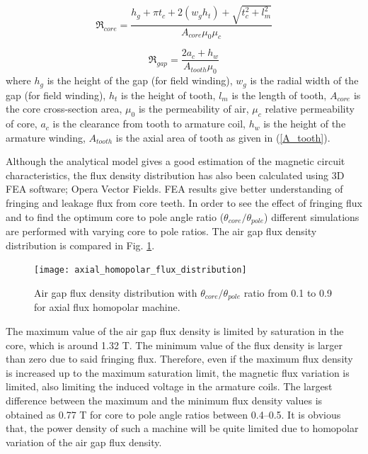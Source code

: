 \documentclass[final,peerreview,onecolumn]{IEEEtran}
\begin{document}
\begin{equation}
    \Re_{core}=\frac{h_{g}+\pi t_{c}+2(w_{g}h_{t})+\sqrt{t_{c}^2+l_{m}^2}}{A_{core}\mu_{0}\mu_{c}}
\end{equation}

\begin{equation}
    \Re_{gap}=\frac{2a_{c}+h_{w}}{A_{tooth}\mu_{0}}
\end{equation}
where $h_{g}$ is the height of the gap (for field winding), $w_{g}$ is the radial width of the gap (for field winding), $h_{t}$ is the height of tooth, $l_{m}$ is the length of tooth, $A_{core}$ is the core cross-section area, $\mu_{0}$ is the permeability of air, $\mu_{c}$ relative permeability of core, $a_{c}$ is the clearance from tooth to armature coil, $h_{w}$ is the height of the armature winding, $A_{tooth}$ is the axial area of tooth as given in (\ref{A_tooth}).

Although the analytical model gives a good estimation of the magnetic circuit characteristics, the flux density distribution has also been calculated using 3D FEA software; Opera Vector Fields. FEA results give better understanding of fringing and leakage flux from core teeth.  In order to see the effect of fringing flux and to find the optimum core to pole angle ratio ($ \theta_{core} /\theta_{pole}$) different simulations are performed with varying core to pole ratios. The air gap flux density distribution is compared in Fig. \ref{axial_homopolar_flux_density}.

\begin{figure}[!h]
\centering
\texttt{[image: axial\_homopolar\_flux\_distribution]}
\caption{Air gap flux density distribution with $ \theta_{core}/\theta_{pole}$ ratio from 0.1 to 0.9 for axial flux homopolar machine.}
\label{axial_homopolar_flux_density}
\end{figure}

The maximum value of the air gap flux density is limited by saturation in the core, which is around 1.32 T. The minimum value of the flux density is larger than zero due to said fringing flux. Therefore, even if the maximum flux density is increased up to the maximum saturation limit, the magnetic flux variation is limited, also limiting the induced voltage in the armature coils. The largest difference between the maximum and the minimum flux density values is obtained as 0.77 T for core to pole angle ratios between 0.4--0.5.  It is obvious that, the power density of such a machine will be quite limited due to homopolar variation of the air gap flux density.
\end{document}
